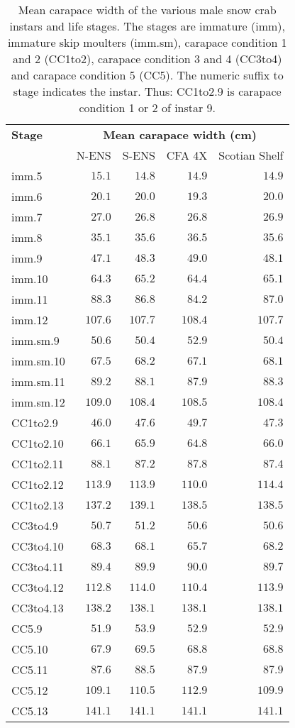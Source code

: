 \documentclass[11pt]{article}
\begin{document}
\begin{table}[!tbp]
 \caption{Mean carapace width of the various male snow crab instars and life stages. The stages are immature (imm), immature skip moulters (imm.sm), carapace condition 1 and 2 (CC1to2), carapace condition 3 and 4 (CC3to4) and carapace condition 5 (CC5). The numeric suffix to stage indicates the instar. Thus: CC1to2.9 is carapace condition 1 or 2 of instar 9. \label{table.cw.stages}} 
 \begin{center}
 \begin{tabular}{lrrrr}\hline\hline
\multicolumn{1}{l}{\bfseries Stage}&
\multicolumn{4}{c}{\bfseries Mean carapace width (cm)}
\\ \cline{2-5}
\multicolumn{1}{l}{}&
\multicolumn{1}{c}{N-ENS}&
\multicolumn{1}{c}{S-ENS}&
\multicolumn{1}{c}{CFA 4X}&
\multicolumn{1}{c}{Scotian Shelf}
\\ \hline
imm.5&$ 15.1$&$ 14.8$&$ 14.9$&$ 14.9$\\
imm.6&$ 20.1$&$ 20.0$&$ 19.3$&$ 20.0$\\
imm.7&$ 27.0$&$ 26.8$&$ 26.8$&$ 26.9$\\
imm.8&$ 35.1$&$ 35.6$&$ 36.5$&$ 35.6$\\
imm.9&$ 47.1$&$ 48.3$&$ 49.0$&$ 48.1$\\
imm.10&$ 64.3$&$ 65.2$&$ 64.4$&$ 65.1$\\
imm.11&$ 88.3$&$ 86.8$&$ 84.2$&$ 87.0$\\
imm.12&$107.6$&$107.7$&$108.4$&$107.7$\\
imm.sm.9&$ 50.6$&$ 50.4$&$ 52.9$&$ 50.4$\\
imm.sm.10&$ 67.5$&$ 68.2$&$ 67.1$&$ 68.1$\\
imm.sm.11&$ 89.2$&$ 88.1$&$ 87.9$&$ 88.3$\\
imm.sm.12&$109.0$&$108.4$&$108.5$&$108.4$\\
CC1to2.9&$ 46.0$&$ 47.6$&$ 49.7$&$ 47.3$\\
CC1to2.10&$ 66.1$&$ 65.9$&$ 64.8$&$ 66.0$\\
CC1to2.11&$ 88.1$&$ 87.2$&$ 87.8$&$ 87.4$\\
CC1to2.12&$113.9$&$113.9$&$110.0$&$114.4$\\
CC1to2.13&$137.2$&$139.1$&$138.5$&$138.5$\\
CC3to4.9&$ 50.7$&$ 51.2$&$ 50.6$&$ 50.6$\\
CC3to4.10&$ 68.3$&$ 68.1$&$ 65.7$&$ 68.2$\\
CC3to4.11&$ 89.4$&$ 89.9$&$ 90.0$&$ 89.7$\\
CC3to4.12&$112.8$&$114.0$&$110.4$&$113.9$\\
CC3to4.13&$138.2$&$138.1$&$138.1$&$138.1$\\
CC5.9&$ 51.9$&$ 53.9$&$ 52.9$&$ 52.9$\\
CC5.10&$ 67.9$&$ 69.5$&$ 68.8$&$ 68.8$\\
CC5.11&$ 87.6$&$ 88.5$&$ 87.9$&$ 87.9$\\
CC5.12&$109.1$&$110.5$&$112.9$&$109.9$\\
CC5.13&$141.1$&$141.1$&$141.1$&$141.1$\\
\hline
\end{tabular}
\end{center}
\end{table}
\end{document}
